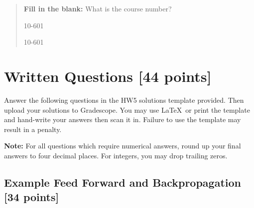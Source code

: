 \documentclass[11pt]{article}
\numberwithin{equation}{section} %
\numberwithin{figure}{section} %
\numberwithin{table}{section} %
\newcommand{\points}[1]{{\bf [#1 points]}}
\begin{document}
\begin{quote}
\textbf{Fill in the blank:} What is the course number?

\begin{tcolorbox}[fit,height=1cm, width=4cm, blank, borderline={1pt}{-2pt},nobeforeafter]
    \begin{center}\huge10-601\end{center}
    \end{tcolorbox}\hspace{2cm}
    \begin{tcolorbox}[fit,height=1cm, width=4cm, blank, borderline={1pt}{-2pt},nobeforeafter]
    \begin{center}\huge10-601\end{center}
    \end{tcolorbox}
\end{quote}

\clearpage
\section{Written Questions \points{44}}
\label{sec:written}

Answer the following questions in the HW5 solutions template provided.  Then upload your solutions to Gradescope. You may use \LaTeX\ or print the template and hand-write your answers then scan it in. Failure to use the template may result in a penalty.

\textbf{Note:} For all questions which require numerical answers, round up your final answers to four decimal places. For integers, you may drop trailing zeros.

\subsection{Example Feed Forward and Backpropagation \points{34}}
\label{sec:onelayertoy}
\end{document}
